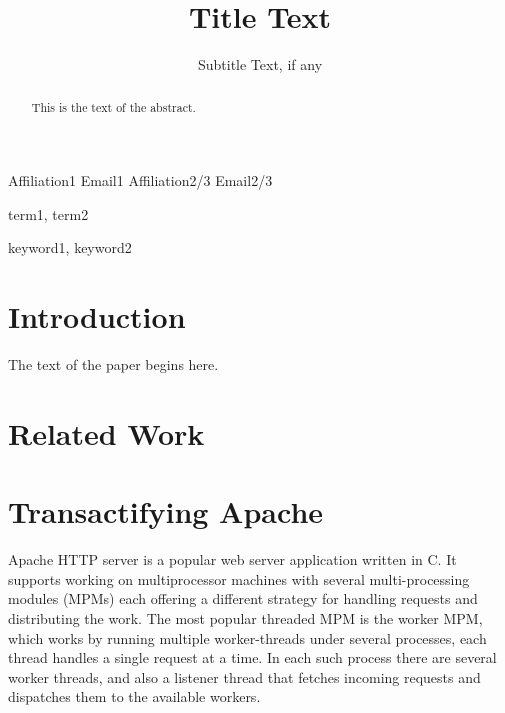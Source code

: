 \documentclass[preprint,natbib,11pt]{sigplanconf}
\begin{document}
\copyrightdata{[to be supplied]} 


\title{Title Text}
\subtitle{Subtitle Text, if any}

           {Affiliation1}
           {Email1}
           {Affiliation2/3}
           {Email2/3}

\maketitle

\begin{abstract}
This is the text of the abstract.
\end{abstract}


\terms
term1, term2

\keywords
keyword1, keyword2

\section{Introduction}

The text of the paper begins here.
\section{Related Work}
\section{Transactifying Apache}
Apache\cite{apache} HTTP server is a popular web server application written in C. It
supports working on multiprocessor machines with several multi-processing
modules (MPMs) each offering a different strategy for handling requests and
distributing the work. The most popular threaded MPM is the worker MPM, which
works by running multiple worker-threads under several processes, each thread
handles a single request at a time. In each such process there are several
worker threads, and also a listener thread that fetches incoming requests and
dispatches them to the available workers.
\end{document}
